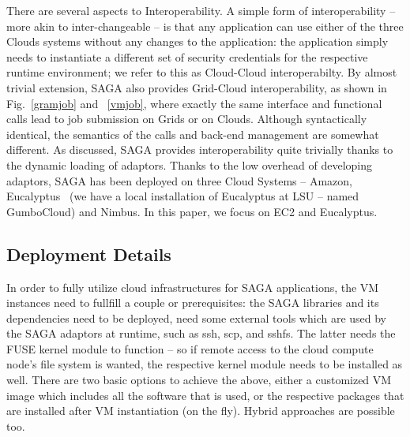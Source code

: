 \documentclass[conference,final]{IEEEtran}
\newcommand{\jhanote}[1]{ {\textcolor{red} { ***SJ: #1 }}}
\newcommand{\jhanote}[1]{}
\begin{document}


There are several aspects to Interoperability. A simple form of
interoperability -- more akin to inter-changeable -- is that any
application can use either of the three Clouds systems without any
changes to the application: the application simply needs to
instantiate a different set of security credentials for the respective
runtime environment; we refer to this as Cloud-Cloud
interoperabilty. By almost trivial extension, SAGA also provides
Grid-Cloud interoperability, as shown in Fig.~\ref{gramjob} and
~\ref{vmjob}, where exactly the same interface and functional calls
lead to job submission on Grids or on Clouds. Although syntactically
identical, the semantics of the calls and back-end management are
somewhat different.  As discussed, SAGA provides interoperability
quite trivially thanks to the dynamic loading of adaptors.  Thanks to
the low overhead of developing adaptors, SAGA has been deployed on
three Cloud Systems -- Amazon, Eucalyptus~\cite{eucalyptus} (we have a
local installation of Eucalyptus at LSU -- named GumboCloud) and
Nimbus.  In this paper, we focus on EC2 and Eucalyptus.

\subsection{Deployment Details}

In order to fully utilize cloud infrastructures for SAGA applications,
the VM instances need to fullfill a couple or prerequisites: the SAGA
libraries and its dependencies need to be deployed, need some external
tools which are used by the SAGA adaptors at runtime, such as ssh,
scp, and sshfs.  The latter needs the FUSE kernel module to function
-- so if remote access to the cloud compute node's file system is
wanted, the respective kernel module needs to be installed as well.
There are two basic options to achieve the above, either a customized
VM image which includes all the software that is used, or the
respective packages that are installed after VM instantiation (on the
fly).  Hybrid approaches are possible too.
\end{document}
